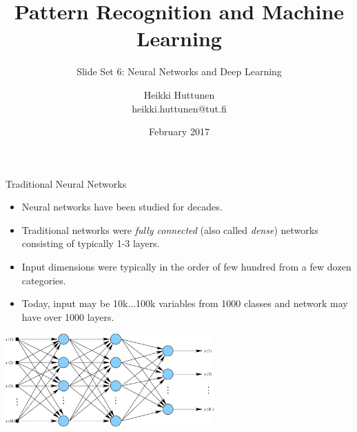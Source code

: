 \documentclass[10pt, aspectratio=169]{beamer} %
\title{Pattern Recognition and Machine Learning}
\subtitle{Slide Set 6: Neural Networks and Deep Learning}
\author{Heikki Huttunen\\
heikki.huttunen@tut.fi}
\institute{Department of Signal Processing\\Tampere University of Technology}
\date{February 2017}
\begin{document}
\maketitle


\lstset{language=Python,style=mystyle} 



\begin{frame}{Traditional Neural Networks}
	
	\begin{itemize}
		\item Neural networks have been studied for decades.
		\item Traditional networks were \emph{fully connected} (also called \emph{dense}) networks consisting of typically 1-3 layers.
		\item Input dimensions were typically in the order of few hundred from a few dozen categories.
		\item Today, input may be 10k...100k variables from 1000 classes and network may have over 1000 layers.
	\end{itemize}
	\centering
	\includegraphics[width=0.6\textwidth]{VanillaNeuralNet.pdf}

\end{frame}
\end{document}
